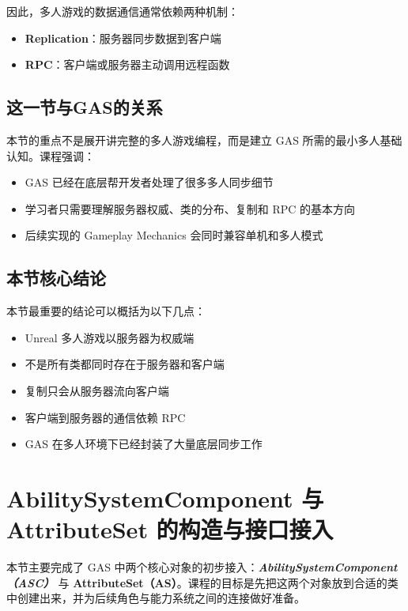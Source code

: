 因此，多人游戏的数据通信通常依赖两种机制：

\begin{itemize}
	\item \textbf{Replication}：服务器同步数据到客户端
	\item \textbf{RPC}：客户端或服务器主动调用远程函数
\end{itemize}

\subsection{这一节与GAS的关系}

本节的重点不是展开讲完整的多人游戏编程，而是建立 GAS 所需的最小多人基础认知。课程强调：

\begin{itemize}
	\item GAS 已经在底层帮开发者处理了很多多人同步细节
	\item 学习者只需要理解服务器权威、类的分布、复制和 RPC 的基本方向
	\item 后续实现的 Gameplay Mechanics 会同时兼容单机和多人模式
\end{itemize}


\subsection{本节核心结论}

本节最重要的结论可以概括为以下几点：

\begin{itemize}
	\item Unreal 多人游戏以服务器为权威端
	\item 不是所有类都同时存在于服务器和客户端
	\item 复制只会从服务器流向客户端
	\item 客户端到服务器的通信依赖 RPC
	\item GAS 在多人环境下已经封装了大量底层同步工作
\end{itemize}


\section{AbilitySystemComponent 与 AttributeSet 的构造与接口接入}

本节主要完成了 GAS 中两个核心对象的初步接入：\textbf{\itshape AbilitySystemComponent（ASC）} 与 \textbf{AttributeSet（AS）}。课程的目标是先把这两个对象放到合适的类中创建出来，并为后续角色与能力系统之间的连接做好准备。

